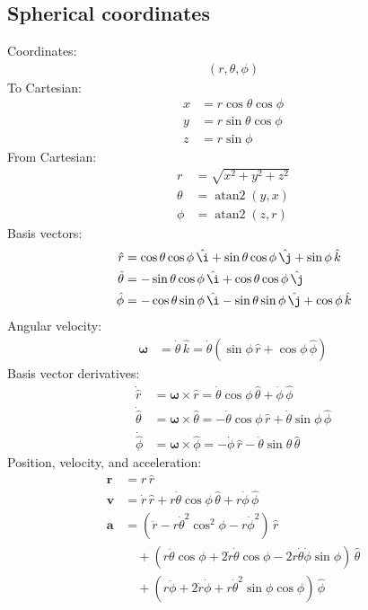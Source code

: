 \documentclass{article}
\renewcommand{\vec}[1]{\boldsymbol{#1}}
\newcommand{\unit}[1]{\,\hat{#1}}
\begin{document}
\subsection{Spherical coordinates}

Coordinates:
\begin{align}
  (r, \theta, \phi)
\end{align}
To Cartesian:
\begin{align}
  x &= r \cos\theta \cos\phi \\
  y &= r \sin\theta \cos\phi \\
  z &= r \sin\phi
\end{align}
From Cartesian:
\begin{align}
  r &= \sqrt{x^2 + y^2 + z^2} \\
  \theta &= \operatorname{atan2}(y, x) \\
  \phi &= \operatorname{atan2}(z, r)
\end{align}
Basis vectors:
\begin{align}
  \unit{r} &= \cos\theta \cos\phi \unit{\i}
  + \sin\theta \cos\phi \unit{\j} + \sin\phi \unit{k} \\
  \unit{\theta} &= - \sin\theta \cos\phi \unit{\i}
  + \cos\theta \cos\phi \unit{\j} \\
  \unit{\phi} &= - \cos\theta \sin\phi \unit{\i}
  - \sin\theta \sin\phi \unit{\j} + \cos\phi \unit{k}
\end{align}
Angular velocity:
\begin{align}
  \vec{\omega} &= \dot\theta \unit{k} = \dot\theta(\sin\phi \unit{r} + \cos\phi \unit{\phi})
\end{align}
Basis vector derivatives:
\begin{align}
  \dot{\hat{r}} &= \vec{\omega} \times \hat{r}
  = \dot\theta \cos\phi \unit{\theta} + \dot\phi \unit{\phi} \\
  \dot{\hat{\theta}} &= \vec{\omega} \times \hat{\theta}
  = - \dot\theta \cos\phi \unit{r} + \dot\theta \sin\phi \unit{\phi} \\
  \dot{\hat{\phi}} &= \vec{\omega} \times \hat{\phi}
  = - \dot\phi \unit{r} - \dot\theta \sin\theta \unit{\theta}
\end{align}
Position, velocity, and acceleration:
\begin{align}
  \vec{r} &= r \unit{r} \\
  \vec{v} &= \dot{r} \unit{r} + r \dot\theta \cos\phi \unit{\theta}
  + r \dot\phi \unit{\phi} \\
  \vec{a} &= (\ddot{r} - r \dot{\theta}^2 \cos^2\phi - r \dot{\phi}^2) \unit{r} \\
  &\quad + (r \ddot\theta \cos\phi + 2 \dot{r} \dot\theta \cos\phi - 2 r \dot\theta \dot\phi \sin\phi) \unit{\theta} \\
  &\quad + (r \ddot\phi + 2 \dot{r} \dot\phi + r \dot{\theta}^2 \sin\phi \cos\phi) \unit{\phi}
\end{align}
\end{document}

